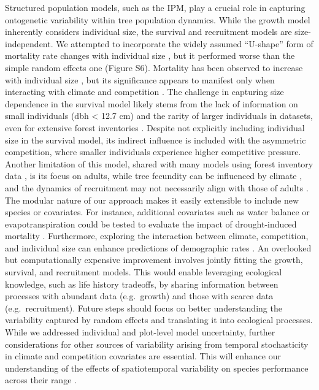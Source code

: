 Structured population models, such as the IPM, play a crucial role in
capturing ontogenetic variability within tree population dynamics. While
the growth model inherently considers individual size, the survival and
recruitment models are size-independent. We attempted to incorporate the
widely assumed ``U-shape'' form of mortality rate changes with
individual size \citep{Lines2010}, but it performed worse than the
simple random effects one (Figure S6). Mortality has been observed to
increase with individual size \citep{Luo2011, Hember2017}, but its
significance appears to manifest only when interacting with climate and
competition \citep{LeSquin2021}. The challenge in capturing size
dependence in the survival model likely stems from the lack of
information on small individuals (dbh \textless{} 12.7 cm) and the
rarity of larger individuals in datasets, even for extensive forest
inventories \citep{Canham2017}. Despite not explicitly including
individual size in the survival model, its indirect influence is
included with the asymmetric competition, where smaller individuals
experience higher competitive pressure. Another limitation of this
model, shared with many models using forest inventory data
\citep[Kunstler2021;][]{LeSquin2021, Guyennon2023}, is its focus on
adults, while tree fecundity can be influenced by climate
\citep{Clark2021}, and the dynamics of recruitment may not necessarily
align with those of adults
\citetext{\citealp{SerraDiaz2016}; \citealp{Wason2017}; \citealp[but
see][]{Canham2016}}.\\

The modular nature of our approach makes it easily extensible to include
new species or covariates. For instance, additional covariates such as
water balance or evapotranspiration could be tested to evaluate the
impact of drought-induced mortality \citep{Peng2011}. Furthermore,
exploring the interaction between climate, competition, and individual
size can enhance predictions of demographic rates
\citep{Peng2011, Ford2017, Rollinson2016, LeSquin2021}. An overlooked
but computationally expensive improvement involves jointly fitting the
growth, survival, and recruitment models. This would enable leveraging
ecological knowledge, such as life history tradeoffs, by sharing
information between processes with abundant data (e.g.~growth) and those
with scarce data (e.g.~recruitment). Future steps should focus on better
understanding the variability captured by random effects and translating
it into ecological processes. While we addressed individual and
plot-level model uncertainty, further considerations for other sources
of variability arising from temporal stochasticity in climate and
competition covariates are essential. This will enhance our
understanding of the effects of spatiotemporal variability on species
performance across their range \citep{Holt2022}.\\

\singlespacing
{\renewcommand{\bibname}{References}
\renewcommand{\bibsection}{\section{\bibname}}
}

